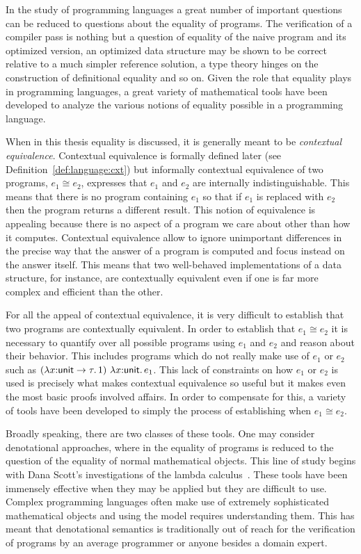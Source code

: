 In the study of programming languages a great number of important
questions can be reduced to questions about the equality of
programs. The verification of a compiler pass is nothing but a
question of equality of the naive program and its optimized version,
an optimized data structure may be shown to be correct relative to a
much simpler reference solution, a type theory hinges on the
construction of definitional equality and so on. Given the role that
equality plays in programming languages, a great variety of
mathematical tools have been developed to analyze the various notions
of equality possible in a programming language.

When in this thesis equality is discussed, it is generally meant to be
\emph{contextual equivalence}. Contextual equivalence is formally
defined later (see Definition~\ref{def:language:cxt}) but informally
contextual equivalence of two programs, $e_1 \cong e_2$, expresses
that $e_1$ and $e_2$ are internally indistinguishable. This means that
there is no program containing $e_1$ so that if $e_1$ is replaced with
$e_2$ then the program returns a different result. This notion of
equivalence is appealing because there is no aspect of a program we
care about other than how it computes. Contextual equivalence allow to
ignore unimportant differences in the precise way that the answer of a
program is computed and focus instead on the answer itself. This means
that two well-behaved implementations of a data structure, for
instance, are contextually equivalent even if one is far more complex
and efficient than the other.

For all the appeal of contextual equivalence, it is very difficult to
establish that two programs are contextually equivalent. In order to
establish that $e_1 \cong e_2$ it is necessary to quantify over all possible
programs using $e_1$ and $e_2$ and reason about their behavior. This
includes programs which do not really make use of $e_1$ or $e_2$ such
as $(\lambda x {:} \mathsf{unit} \to \tau.\, 1)\ \lambda x {:} \mathsf{unit}.\, e_1$. This
lack of constraints on how $e_1$ or $e_2$ is used is precisely what
makes contextual equivalence so useful but it makes even the most
basic proofs involved affairs. In order to compensate for this, a
variety of tools have been developed to simply the process of
establishing when $e_1 \cong e_2$.

Broadly speaking, there are two classes of these tools. One may
consider denotational approaches, where in the equality of programs is
reduced to the question of the equality of normal mathematical
objects. This line of study begins with Dana Scott's investigations of
the lambda calculus~\citep{Scott:76}. These tools have been
immensely effective when they may be applied but they are difficult to
use. Complex programming languages often make use of extremely
sophisticated mathematical objects and using the model requires
understanding them. This has meant that denotational semantics is
traditionally out of reach for the verification of programs by an
average programmer or anyone besides a domain expert.

